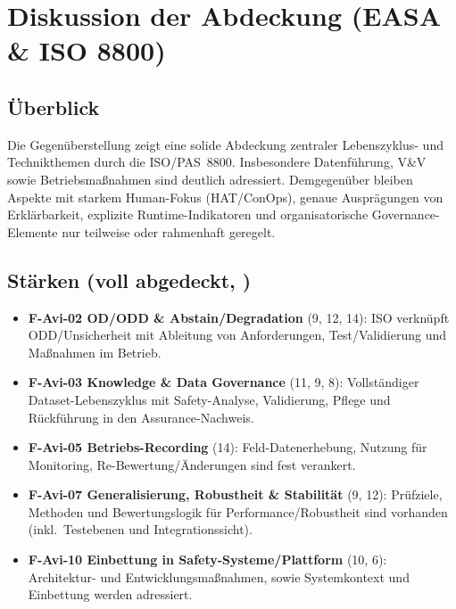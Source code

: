 \section{Diskussion der Abdeckung (EASA \& ISO 8800)}

\subsection{Überblick}
Die Gegenüberstellung zeigt eine solide Abdeckung zentraler Lebenszyklus- und Technikthemen durch die ISO/PAS~8800. 
Insbesondere Datenführung, V\&V sowie Betriebsmaßnahmen sind deutlich adressiert. 
Demgegenüber bleiben Aspekte mit starkem Human-Fokus (HAT/ConOps), genaue Ausprägungen von Erklärbarkeit, 
explizite Runtime-Indikatoren und organisatorische Governance-Elemente nur teilweise oder rahmenhaft geregelt.

\subsection{Stärken (voll abgedeckt, \covV)}
\begin{itemize}
  \item \textbf{F-Avi-02 OD/ODD \& Abstain/Degradation} (9, 12, 14): ISO verknüpft ODD/Unsicherheit mit Ableitung von Anforderungen, Test/Validierung und Maßnahmen im Betrieb.
  \item \textbf{F-Avi-03 Knowledge \& Data Governance} (11, 9, 8): Vollständiger Dataset-Lebenszyklus mit Safety-Analyse, Validierung, Pflege und Rückführung in den Assurance-Nachweis.
  \item \textbf{F-Avi-05 Betriebs-Recording} (14): Feld-Datenerhebung, Nutzung für Monitoring, Re-Bewertung/Änderungen sind fest verankert.
  \item \textbf{F-Avi-07 Generalisierung, Robustheit \& Stabilität} (9, 12): Prüfziele, Methoden und Bewertungslogik für Performance/Robustheit sind vorhanden (inkl.\ Testebenen und Integrationssicht).
  \item \textbf{F-Avi-10 Einbettung in Safety-Systeme/Plattform} (10, 6): Architektur- und Entwicklungsmaßnahmen, sowie Systemkontext und Einbettung werden adressiert.
\end{itemize}

